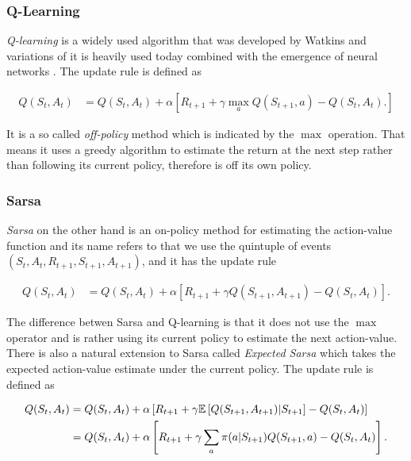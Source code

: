 \documentclass[result.tex]{subfiles}
\begin{document}
    \subsubsection*{Q-Learning}

    \textit{Q-learning} is a widely used algorithm that was developed by Watkins \cite{watkins1989learning} and variations of it is heavily used today combined with the emergence of neural networks \cite{mnih2013playing}. The update rule is defined as

    \begin{align*}
        Q(S_t, A_t) &=
        Q(S_t , A_t) +
        \alpha \left[
        R_{t + 1} +
        \gamma \max_a Q(S_{t + 1}, a) - Q(S_t, A_t).
        \right]
    \end{align*}

    It is a so called \textit{off-policy} method which is indicated by the $\max$ operation. That means it uses a greedy algorithm to estimate the return at the next step rather than following its current policy, therefore is off its own policy.

    \subsubsection*{Sarsa}

    \textit{Sarsa} on the other hand is an on-policy method for estimating the action-value function and its name refers to that we use the quintuple of events $(S_t, A_t, R_{t + 1}, S_{t + 1}, A_{t + 1})$, and it has the update rule

    \begin{align*}
        Q(S_t, A_t) &=
        Q(S_t , A_t) +
        \alpha \left[
        R_{t + 1} +
        \gamma Q(S_{t + 1}, A_{t + 1}) - Q(S_t, A_t)
        \right].
    \end{align*}

    The difference betwen Sarsa and Q-learning is that it does not use the $\max$ operator and is rather using its current policy to estimate the next action-value. There is also a natural extension to Sarsa called \textit{Expected Sarsa} which takes the expected action-value estimate under the current policy. The update rule is defined as

    \begin{align*}
        Q(S_t, A_t) &=
        Q(S_t , A_t) +
        \alpha \left[
        R_{t + 1} +
        \gamma \mathbb{E} \left[ Q(S_{t + 1}, A_{t + 1}) | S_{t + 1}
        \right] -
        Q(S_t, A_t)
        \right] \\
        &=
        Q(S_t , A_t) +
        \alpha \left[
        R_{t + 1} +
        \gamma \sum_a \pi (a | S_{t + 1}) Q(S_{t + 1}, a) -
        Q(S_t, A_t)
        \right].
    \end{align*}
\end{document}

